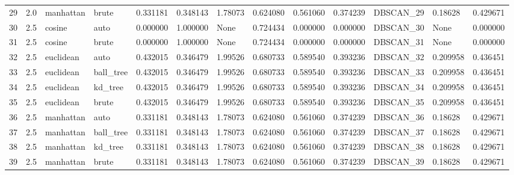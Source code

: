 \begin{tabular}{lrllrrlrrrllr}
29 &  2.0 &  manhattan &      brute &             0.331181 &            0.348143 &              1.78073 &               0.624080 &           0.561060 &           0.374239 &  DBSCAN\_29 &          0.18628 &         0.429671 \\
30 &  2.5 &     cosine &       auto &             0.000000 &            1.000000 &                 None &               0.724434 &           0.000000 &           0.000000 &  DBSCAN\_30 &             None &         0.000000 \\
31 &  2.5 &     cosine &      brute &             0.000000 &            1.000000 &                 None &               0.724434 &           0.000000 &           0.000000 &  DBSCAN\_31 &             None &         0.000000 \\
32 &  2.5 &  euclidean &       auto &             0.432015 &            0.346479 &              1.99526 &               0.680733 &           0.589540 &           0.393236 &  DBSCAN\_32 &         0.209958 &         0.436451 \\
33 &  2.5 &  euclidean &  ball\_tree &             0.432015 &            0.346479 &              1.99526 &               0.680733 &           0.589540 &           0.393236 &  DBSCAN\_33 &         0.209958 &         0.436451 \\
34 &  2.5 &  euclidean &    kd\_tree &             0.432015 &            0.346479 &              1.99526 &               0.680733 &           0.589540 &           0.393236 &  DBSCAN\_34 &         0.209958 &         0.436451 \\
35 &  2.5 &  euclidean &      brute &             0.432015 &            0.346479 &              1.99526 &               0.680733 &           0.589540 &           0.393236 &  DBSCAN\_35 &         0.209958 &         0.436451 \\
36 &  2.5 &  manhattan &       auto &             0.331181 &            0.348143 &              1.78073 &               0.624080 &           0.561060 &           0.374239 &  DBSCAN\_36 &          0.18628 &         0.429671 \\
37 &  2.5 &  manhattan &  ball\_tree &             0.331181 &            0.348143 &              1.78073 &               0.624080 &           0.561060 &           0.374239 &  DBSCAN\_37 &          0.18628 &         0.429671 \\
38 &  2.5 &  manhattan &    kd\_tree &             0.331181 &            0.348143 &              1.78073 &               0.624080 &           0.561060 &           0.374239 &  DBSCAN\_38 &          0.18628 &         0.429671 \\
39 &  2.5 &  manhattan &      brute &             0.331181 &            0.348143 &              1.78073 &               0.624080 &           0.561060 &           0.374239 &  DBSCAN\_39 &          0.18628 &         0.429671 \\
\bottomrule
\end{tabular}
